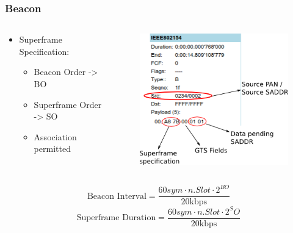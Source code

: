 \begin{frame}[fragile]
  \frametitle{Beacon}
  \begin{columns}
    \begin{column}{.58\linewidth}
      \begin{itemize}
      	\item Superframe Specification:
      	\begin{itemize}
	  \item Beacon Order -> BO
	  \item Superframe Order -> SO
	  \item Association permitted
      	\end{itemize}
      \end{itemize}
    \end{column}
    \hfill
    \begin{column}{.4\linewidth}
      \begin{figure}
	\includegraphics[width=\textwidth]{img/beacon.png}
      \end{figure}
    \end{column}
  \end{columns}
  \vfill
  $$\text{Beacon Interval} = \frac{60sym \cdot n.Slot \cdot 2^{BO}}{20\text{kbps}}$$
  $$\text{Superframe Duration} = \frac{60sym \cdot n.Slot \cdot 2^SO}{20\text{kbps}}$$
\end{frame}


